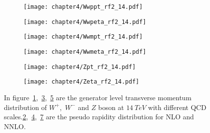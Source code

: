 \documentclass[a4paper,12pt]{report}
\numberwithin{equation}{section}
\begin{document}
\begin{figure}[H]
\centering
\begin{subfigure}{0.49\textwidth}
\texttt{[image: chapter4/Wwppt\_rf2\_14.pdf]}
\vspace*{-8mm}
\caption{}
\label{rf2pt1}
\end{subfigure}
\begin{subfigure}{0.49\textwidth}
\texttt{[image: chapter4/Wwpeta\_rf2\_14.pdf]}
\vspace*{-8mm}
\caption{}
\label{rf2eta1}
\end{subfigure}
\begin{subfigure}{0.49\textwidth}
\texttt{[image: chapter4/Wwmpt\_rf2\_14.pdf]}
\vspace*{-8mm}
\caption{}
\label{rf2pt2}
\end{subfigure}
\begin{subfigure}{0.49\textwidth}
\texttt{[image: chapter4/Wwmeta\_rf2\_14.pdf]}
\vspace*{-8mm}
\caption{}
\label{rf2eta2}
\end{subfigure}
\begin{subfigure}{0.49\textwidth}
\texttt{[image: chapter4/Zpt\_rf2\_14.pdf]}
\vspace*{-8mm}
\caption{}
\label{rf2pt3}
\end{subfigure}
\begin{subfigure}{0.49\textwidth}
\texttt{[image: chapter4/Zeta\_rf2\_14.pdf]}
\vspace*{-8mm}
\caption{}
\label{rf2eta3}
\end{subfigure}
\caption{In figure~\ref{rf2pt1},~\ref{rf2pt2},~\ref{rf2pt3} are the generator level transverse momentum distribution of $W^{+}$,~$W^{-}$ and $Z$ boson at $14~TeV$ with different QCD scales.\ref{rf2eta1},~\ref{rf2eta2},~\ref{rf2eta3} are the pseudo rapidity distribution for NLO and NNLO.}  
\end{figure}
\end{document}

